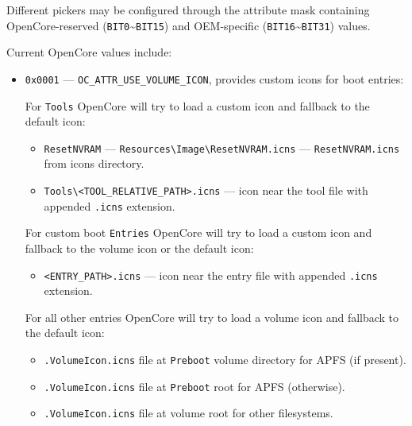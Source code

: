 \documentclass[]{article}
\providecommand{\tightlist}{%
  \setlength{\itemsep}{0pt}\setlength{\parskip}{0pt}}
\begin{document}
\begin{enumerate}
  Different pickers may be configured through the attribute mask containing
  OpenCore-reserved (\texttt{BIT0}\textasciitilde\texttt{BIT15}) and OEM-specific
  (\texttt{BIT16}\textasciitilde\texttt{BIT31}) values.

  Current OpenCore values include:

  \begin{itemize}
  \tightlist
  \item \texttt{0x0001} --- \texttt{OC\_ATTR\_USE\_VOLUME\_ICON}, provides custom icons
    for boot entries:

    For \texttt{Tools} OpenCore will try to load a custom icon and fallback to the default icon:
    \begin{itemize}
    \tightlist
      \item \texttt{ResetNVRAM} --- \texttt{Resources\textbackslash Image\textbackslash ResetNVRAM.icns}
        --- \texttt{ResetNVRAM.icns} from icons directory.
      \item \texttt{Tools\textbackslash <TOOL\_RELATIVE\_PATH>.icns}
        --- icon near the tool file with appended \texttt{.icns} extension.
    \end{itemize} \medskip

    For custom boot \texttt{Entries} OpenCore will try to load a custom icon and fallback
    to the volume icon or the default icon:
    \begin{itemize}
    \tightlist
      \item \texttt{<ENTRY\_PATH>.icns} --- icon near the entry file with appended \texttt{.icns} extension.
    \end{itemize} \medskip

    For all other entries OpenCore will try to load a volume icon and fallback to the default icon:
    \begin{itemize}
    \tightlist
      \item \texttt{.VolumeIcon.icns} file at \texttt{Preboot} volume directory for APFS (if present).
      \item \texttt{.VolumeIcon.icns} file at \texttt{Preboot} root for APFS (otherwise).
      \item \texttt{.VolumeIcon.icns} file at volume root for other filesystems.
    \end{itemize} \medskip


\end{itemize}
\end{enumerate}
\end{document}
